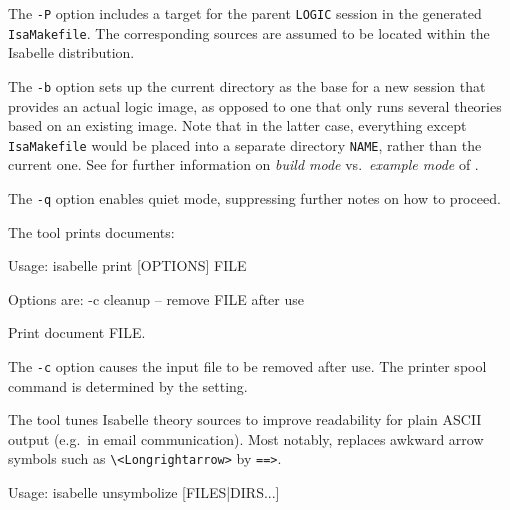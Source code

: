 \begin{isabellebody}
\begin{isamarkuptext}
  \medskip The \verb|-P| option includes a target for the
  parent \verb|LOGIC| session in the generated \verb|IsaMakefile|.  The corresponding sources are assumed to be located
  within the Isabelle distribution.

  \medskip The \verb|-b| option sets up the current directory
  as the base for a new session that provides an actual logic image,
  as opposed to one that only runs several theories based on an
  existing image.  Note that in the latter case, everything except
  \verb|IsaMakefile| would be placed into a separate directory
  \verb|NAME|, rather than the current one.  See
   for further information on \emph{build
  mode} vs.\ \emph{example mode} of \hyperlink{tool.usedir}{\mbox{}}.

  \medskip The \verb|-q| option enables quiet mode, suppressing
  further notes on how to proceed.%
\end{isamarkuptext}%
\isamarkuptrue%
%
\isamarkuptrue%
%
\begin{isamarkuptext}%
The \hypertarget{tool.print}{\hyperlink{tool.print}{\mbox{}}} tool prints documents:
\begin{ttbox}
Usage: isabelle print [OPTIONS] FILE

  Options are:
    -c           cleanup -- remove FILE after use

  Print document FILE.
\end{ttbox}

  The \verb|-c| option causes the input file to be removed
  after use.  The printer spool command is determined by the \hyperlink{setting.PRINT-COMMAND}{\mbox{}} setting.%
\end{isamarkuptext}%
\isamarkuptrue%
%
\isamarkuptrue%
%
\begin{isamarkuptext}%
The \hypertarget{tool.unsymbolize}{\hyperlink{tool.unsymbolize}{\mbox{}}} tool tunes Isabelle theory sources to
  improve readability for plain ASCII output (e.g.\ in email
  communication).  Most notably, \hyperlink{tool.unsymbolize}{\mbox{}} replaces awkward
  arrow symbols such as \verb|\|\verb|<Longrightarrow>|
  by \verb|==>|.
\begin{ttbox}
Usage: isabelle unsymbolize [FILES|DIRS...]


\end{ttbox}
\end{isamarkuptext}
\end{isabellebody}
